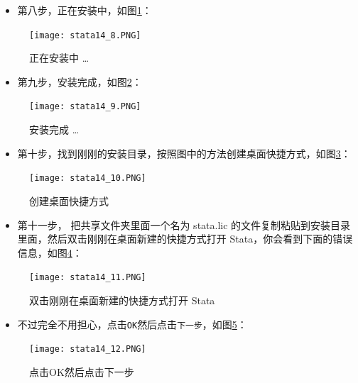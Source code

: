 \documentclass[cn,fancy,blue,11pt]{elegantbook}
\begin{document}
\begin{itemize}
\item
  第八步，正在安装中，如图\ref{fig:stata14_8}：
\end{itemize}

\begin{figure}[htbp]
  \centering
  \texttt{[image: stata14\_8.PNG]}
  \caption{正在安装中 \dots}
  \label{fig:stata14_8}
\end{figure}

\begin{itemize}
\item
  第九步，安装完成，如图\ref{fig:stata14_9}：
\end{itemize}

\begin{figure}[htbp]
  \centering
  \texttt{[image: stata14\_9.PNG]}
  \caption{安装完成 \dots}
  \label{fig:stata14_9}
\end{figure}

\begin{itemize}
\item
  第十步，找到刚刚的安装目录，按照图中的方法创建桌面快捷方式，如图\ref{fig:stata14_10}：
\end{itemize}

\begin{figure}[htbp]
  \centering
  \texttt{[image: stata14\_10.PNG]}
  \caption{创建桌面快捷方式}
  \label{fig:stata14_10}
\end{figure}

\begin{itemize}
\item
  第十一步， 把共享文件夹里面一个名为 stata.lic 的文件复制粘贴到安装目录里面，然后双击刚刚在桌面新建的快捷方式打开 Stata，你会看到下面的错误信息，如图\ref{fig:stata14_11}：
\end{itemize}

\begin{figure}[htbp]
  \centering
  \texttt{[image: stata14\_11.PNG]}
  \caption{双击刚刚在桌面新建的快捷方式打开 Stata}
  \label{fig:stata14_11}
\end{figure}

\begin{itemize}
\item
  不过完全不用担心，点击\lstinline{OK}然后点击\lstinline{下一步}，如图\ref{fig:stata14_12}：
\end{itemize}

\begin{figure}[htbp]
  \centering
  \texttt{[image: stata14\_12.PNG]}
  \caption{点击OK然后点击下一步}
  \label{fig:stata14_12}
\end{figure}
\end{document}

